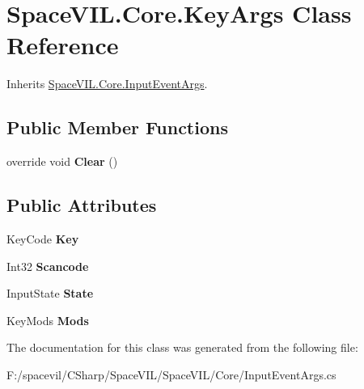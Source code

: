 \hypertarget{class_space_v_i_l_1_1_core_1_1_key_args}{}\section{Space\+V\+I\+L.\+Core.\+Key\+Args Class Reference}
\label{class_space_v_i_l_1_1_core_1_1_key_args}


Inherits \mbox{\hyperlink{class_space_v_i_l_1_1_core_1_1_input_event_args}{Space\+V\+I\+L.\+Core.\+Input\+Event\+Args}}.

\subsection*{Public Member Functions}
\begin{DoxyCompactItemize}
\item 
\mbox{\label{class_space_v_i_l_1_1_core_1_1_key_args_a1521dd5bebbcc13ac6f1bcffe9dac487}} 
override void {\bfseries Clear} ()
\end{DoxyCompactItemize}
\subsection*{Public Attributes}
\begin{DoxyCompactItemize}
\item 
\mbox{\label{class_space_v_i_l_1_1_core_1_1_key_args_a15ddee7149bbe1aebc6449a7e7952a25}} 
Key\+Code {\bfseries Key}
\item 
\mbox{\label{class_space_v_i_l_1_1_core_1_1_key_args_af188536c7b040c27d4348e02961e955e}} 
Int32 {\bfseries Scancode}
\item 
\mbox{\label{class_space_v_i_l_1_1_core_1_1_key_args_a605a658b9d5ce2855a6a4730dc03d2ce}} 
Input\+State {\bfseries State}
\item 
\mbox{\label{class_space_v_i_l_1_1_core_1_1_key_args_a00396e83c43c0c8ffd01e9d320a983c1}} 
Key\+Mods {\bfseries Mods}
\end{DoxyCompactItemize}


The documentation for this class was generated from the following file\+:\begin{DoxyCompactItemize}
\item 
F\+:/spacevil/\+C\+Sharp/\+Space\+V\+I\+L/\+Space\+V\+I\+L/\+Core/Input\+Event\+Args.\+cs\end{DoxyCompactItemize}
